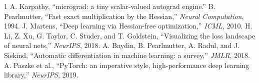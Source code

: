 \documentclass[conference]{IEEEtran}
\begin{document}
\begin{thebibliography}{1}
 A. Karpathy, ``micrograd: a tiny scalar-valued autograd engine.''
 B. Pearlmutter, ``Fast exact multiplication by the Hessian,'' \emph{Neural Computation}, 1994.
 J. Martens, ``Deep learning via Hessian-free optimization,'' \emph{ICML}, 2010.
 H. Li, Z. Xu, G. Taylor, C. Studer, and T. Goldstein, ``Visualizing the loss landscape of neural nets,'' \emph{NeurIPS}, 2018.
 A. Baydin, B. Pearlmutter, A. Radul, and J. Siskind, ``Automatic differentiation in machine learning: a survey,'' \emph{JMLR}, 2018.
 A. Paszke et al., ``PyTorch: an imperative style, high-performance deep learning library,'' \emph{NeurIPS}, 2019.
\end{thebibliography}
\end{document}
